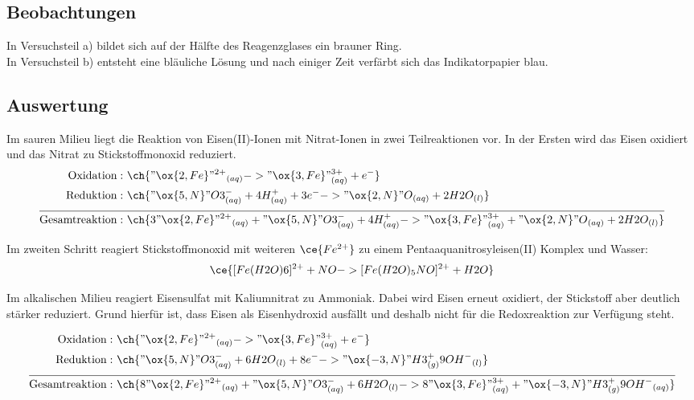 \documentclass[12pt]{scrartcl} %
\begin{document}
\subsection{Beobachtungen}
In Versuchsteil a) bildet sich auf der Hälfte des Reagenzglases ein brauner Ring.\\ 
In Versuchsteil b) entsteht eine bläuliche Lösung und nach einiger Zeit verfärbt sich das Indikatorpapier blau.

\subsection{Auswertung}

Im sauren Milieu liegt die Reaktion von Eisen(II)-Ionen mit Nitrat-Ionen in zwei Teilreaktionen vor. In der Ersten wird das Eisen oxidiert und das Nitrat zu Stickstoffmonoxid reduziert.
\begin{align*}
\mathrm{Oxidation:} &~ \ch{"\ox{2,Fe}" {^{2+}}_{(aq)} ->  "\ox{3,Fe}" {}^{3+}_{(aq)} + e^{-}} \\
\notag
\mathrm{Reduktion:} &~ \ch{"\ox{5,N}" {}O3^{-}_{(aq)} + 4 H^+_{(aq)} + 3 e^{-} -> "\ox{2,N}" O{}_{(aq)} + 2 H2O_{(l)}}\\[2mm]
\hline\notag
\\[-5mm]
\mathrm{Gesamtreaktion:} &~ \ch{3 "\ox{2,Fe}" {^{2+}}_{(aq)} + "\ox{5,N}" {}O3^{-}_{(aq)} + 4 H^+_{(aq)} -> "\ox{3,Fe}" {}^{3+}_{(aq)} + "\ox{2,N}" O{}_{(aq)} + 2 H2O_{(l)}}
\end{align*}

Im zweiten Schritt reagiert Stickstoffmonoxid mit weiteren $\ce{Fe^{2+}}$ zu einem Pentaaquanitrosyleisen(II) Komplex und Wasser:
\begin{equation}
    \ce{[Fe(H2O)6]^{2+} + NO -> [Fe(H2O)_5NO]^{2+} + H2O}
\end{equation}

Im alkalischen Milieu reagiert Eisensulfat mit Kaliumnitrat zu Ammoniak. Dabei wird Eisen erneut oxidiert, der Stickstoff aber deutlich stärker reduziert. Grund hierfür ist, dass Eisen als Eisenhydroxid ausfällt und deshalb nicht für die Redoxreaktion zur Verfügung steht.

\begin{align*}
\mathrm{Oxidation:} &~ \ch{"\ox{2,Fe}" {^{2+}}_{(aq)} ->  "\ox{3,Fe}" {}^{3+}_{(aq)} + e^{-}} \\
\notag
\mathrm{Reduktion:} &~ \ch{"\ox{5,N}" {}O3^{-}_{(aq)} + 6 {H2O}_{(l)} + 8 e^{-} -> "\ox{-3,N}" {H3}_{(g)} ^ +  9 {OH^{-}}_{(l)}}\\[2mm]
\hline\notag
\\[-5mm]
\mathrm{Gesamtreaktion:} &~ \ch{8 "\ox{2,Fe}" {^{2+}}_{(aq)} + "\ox{5,N}" {}O3^{-}_{(aq)} + 6 {H2O}_{(l)} -> 8 "\ox{3,Fe}" {}^{3+}_{(aq)} + "\ox{-3,N}" {H3}_{(g)} ^ + 9 {OH^{-}}_{(aq)}}
\end{align*}
\end{document}
